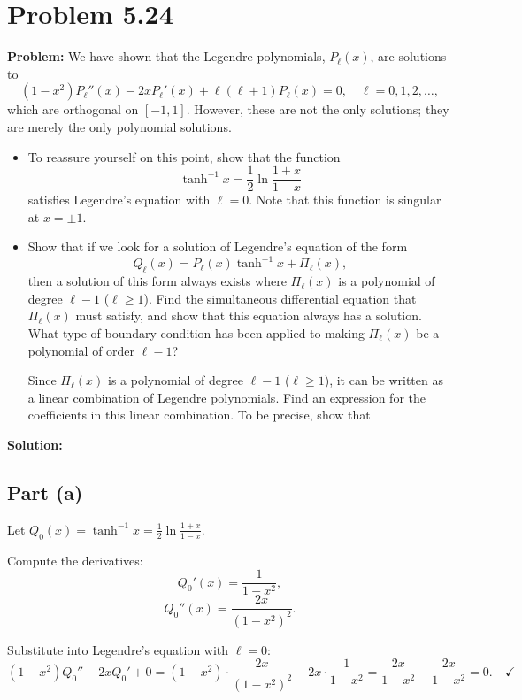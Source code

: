 \documentclass[12pt]{article}
\begin{document}
\section*{Problem 5.24}

\textbf{Problem:} We have shown that the Legendre polynomials, $P_\ell(x)$, are solutions to
\[
(1-x^2)P_\ell''(x) - 2xP_\ell'(x) + \ell(\ell+1)P_\ell(x) = 0, \quad \ell = 0, 1, 2, \ldots,
\]
which are orthogonal on $[-1,1]$. However, these are not the only solutions; they are merely the only polynomial solutions.

\begin{itemize}
\item[(a)] To reassure yourself on this point, show that the function
\[
\tanh^{-1}x = \frac{1}{2}\ln\frac{1+x}{1-x}
\]
satisfies Legendre's equation with $\ell = 0$. Note that this function is singular at $x = \pm 1$.

\item[(b)] Show that if we look for a solution of Legendre's equation of the form
\[
Q_\ell(x) = P_\ell(x)\tanh^{-1}x + \Pi_\ell(x),
\]
then a solution of this form always exists where $\Pi_\ell(x)$ is a polynomial of degree $\ell - 1$ ($\ell \geq 1$). Find the simultaneous differential equation that $\Pi_\ell(x)$ must satisfy, and show that this equation always has a solution. What type of boundary condition has been applied to making $\Pi_\ell(x)$ be a polynomial of order $\ell - 1$?

Since $\Pi_\ell(x)$ is a polynomial of degree $\ell - 1$ ($\ell \geq 1$), it can be written as a linear combination of Legendre polynomials. Find an expression for the coefficients in this linear combination. To be precise, show that
\end{itemize}

\bigskip
\textbf{Solution:}

\subsection*{Part (a)}

Let $Q_0(x) = \tanh^{-1}x = \frac{1}{2}\ln\frac{1+x}{1-x}$.

Compute the derivatives:
\[
Q_0'(x) = \frac{1}{1-x^2},
\]
\[
Q_0''(x) = \frac{2x}{(1-x^2)^2}.
\]

Substitute into Legendre's equation with $\ell = 0$:
\[
(1-x^2)Q_0'' - 2xQ_0' + 0 = (1-x^2)\cdot\frac{2x}{(1-x^2)^2} - 2x\cdot\frac{1}{1-x^2} = \frac{2x}{1-x^2} - \frac{2x}{1-x^2} = 0. \quad\checkmark
\]
\end{document}
